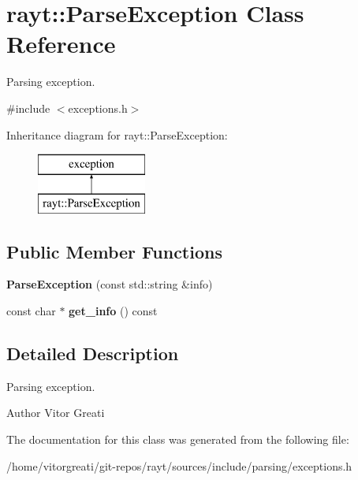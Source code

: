 \hypertarget{classrayt_1_1_parse_exception}{}\section{rayt\+::Parse\+Exception Class Reference}
\label{classrayt_1_1_parse_exception}


Parsing exception.  




{\ttfamily \#include $<$exceptions.\+h$>$}

Inheritance diagram for rayt\+::Parse\+Exception\+:\begin{figure}[H]
\begin{center}
\leavevmode
\includegraphics[height=2.000000cm]{classrayt_1_1_parse_exception}
\end{center}
\end{figure}
\subsection*{Public Member Functions}
\begin{DoxyCompactItemize}
\item 
\mbox{\label{classrayt_1_1_parse_exception_a1628c109c3e81c34776070dec690c97c}} 
{\bfseries Parse\+Exception} (const std\+::string \&info)
\item 
\mbox{\label{classrayt_1_1_parse_exception_ad0cb24bda0f6b9b08e36a776486af03a}} 
const char $\ast$ {\bfseries get\+\_\+info} () const
\end{DoxyCompactItemize}


\subsection{Detailed Description}
Parsing exception. 

\begin{DoxyAuthor}{Author}
Vitor Greati 
\end{DoxyAuthor}


The documentation for this class was generated from the following file\+:\begin{DoxyCompactItemize}
\item 
/home/vitorgreati/git-\/repos/rayt/sources/include/parsing/exceptions.\+h\end{DoxyCompactItemize}
